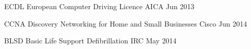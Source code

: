 

\begin{cvhonors}

	\cvhonor
	{ECDL}
	{European Computer Driving Licence}
	{AICA}
	{Jun 2013}
	
	\cvhonor
	{CCNA Discovery}
	{Networking for Home and Small Businesses}
	{Cisco}
	{Jun 2014}
	
	\cvhonor
	{BLSD}
	{Basic Life Support Defibrillation}
	{IRC}
	{May 2014}

\end{cvhonors}
